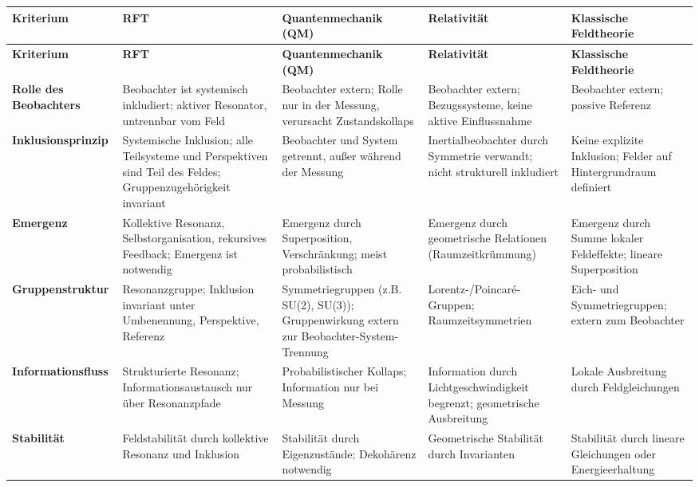 \documentclass[12pt]{article}
\begin{document}
\renewcommand{\arraystretch}{1.3}
\begin{center}
	\begin{longtable}{|p{4cm}|p{3cm}|p{3cm}|p{3cm}|p{3cm}|}
		\hline
		\textbf{Kriterium} & \textbf{RFT} & \textbf{Quantenmechanik (QM)} & \textbf{Relativität} & \textbf{Klassische Feldtheorie} \\
		\hline
		\endfirsthead
		
		\hline
		\textbf{Kriterium} & \textbf{RFT} & \textbf{Quantenmechanik (QM)} & \textbf{Relativität} & \textbf{Klassische Feldtheorie} \\
		\hline
		\endhead
		
		\hline
		\endfoot
		
		\hline
		\endlastfoot
		
		\textbf{Rolle des Beobachters} & Beobachter ist systemisch inkludiert; aktiver Resonator, untrennbar vom Feld & Beobachter extern; Rolle nur in der Messung, verursacht Zustandskollaps & Beobachter extern; Bezugssysteme, keine aktive Einflussnahme & Beobachter extern; passive Referenz \\
		\hline
		\textbf{Inklusionsprinzip} & Systemische Inklusion; alle Teilsysteme und Perspektiven sind Teil des Feldes; Gruppenzugehörigkeit invariant & Beobachter und System getrennt, außer während der Messung & Inertialbeobachter durch Symmetrie verwandt; nicht strukturell inkludiert & Keine explizite Inklusion; Felder auf Hintergrundraum definiert \\
		\hline
		\textbf{Emergenz} & Kollektive Resonanz, Selbstorganisation, rekursives Feedback; Emergenz ist notwendig & Emergenz durch Superposition, Verschränkung; meist probabilistisch & Emergenz durch geometrische Relationen (Raumzeitkrümmung) & Emergenz durch Summe lokaler Feldeffekte; lineare Superposition \\
		\hline
		\textbf{Gruppenstruktur} & Resonanzgruppe; Inklusion invariant unter Umbenennung, Perspektive, Referenz & Symmetriegruppen (z.B. SU(2), SU(3)); Gruppenwirkung extern zur Beobachter-System-Trennung & Lorentz-/Poincaré-Gruppen; Raumzeitsymmetrien & Eich- und Symmetriegruppen; extern zum Beobachter \\
		\hline
		\textbf{Informationsfluss} & Strukturierte Resonanz; Informationsaustausch nur über Resonanzpfade & Probabilistischer Kollaps; Information nur bei Messung & Information durch Lichtgeschwindigkeit begrenzt; geometrische Ausbreitung & Lokale Ausbreitung durch Feldgleichungen \\
		\hline
		\textbf{Stabilität} & Feldstabilität durch kollektive Resonanz und Inklusion & Stabilität durch Eigenzustände; Dekohärenz notwendig & Geometrische Stabilität durch Invarianten & Stabilität durch lineare Gleichungen oder Energieerhaltung \\

\end{longtable}
\end{center}
\end{document}
